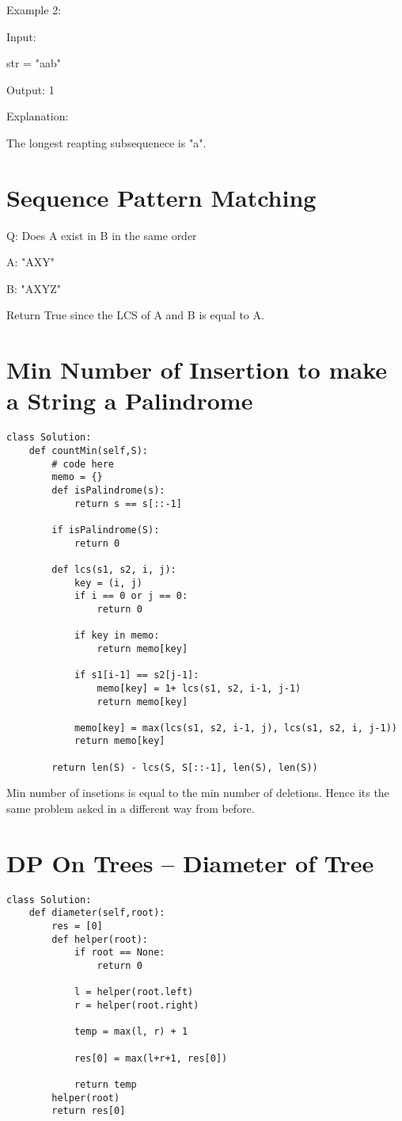 \documentclass[24pt, a4]{article}
\begin{document}
Example 2:

Input:

str = "aab"

Output: 1

Explanation: 

The longest reapting subsequenece is "a".

\newpage
\section{Sequence Pattern Matching}
Q: Does A exist in B in the same order

A: "AXY"

B: "AXYZ"

Return True since the LCS of A and B is equal to A.

\section{Min Number of Insertion to make a String a Palindrome}
\begin{lstlisting}
class Solution:
    def countMin(self,S):
        # code here 
        memo = {}
        def isPalindrome(s):
            return s == s[::-1]
            
        if isPalindrome(S):
            return 0
            
        def lcs(s1, s2, i, j):
            key = (i, j)
            if i == 0 or j == 0:
                return 0
                
            if key in memo:
                return memo[key]
                
            if s1[i-1] == s2[j-1]:
                memo[key] = 1+ lcs(s1, s2, i-1, j-1)
                return memo[key]
                
            memo[key] = max(lcs(s1, s2, i-1, j), lcs(s1, s2, i, j-1))
            return memo[key]
    
        return len(S) - lcs(S, S[::-1], len(S), len(S))
\end{lstlisting}

Min number of insetions is equal to the min number of deletions. Hence its the same problem asked in a different way from before.


\newpage
\section{DP On Trees -- Diameter of Tree}
\begin{lstlisting}
class Solution:    
    def diameter(self,root):
        res = [0]
        def helper(root):
            if root == None:
                return 0
                
            l = helper(root.left)
            r = helper(root.right)
            
            temp = max(l, r) + 1
            
            res[0] = max(l+r+1, res[0])
            
            return temp
        helper(root)
        return res[0]
\end{lstlisting}
\end{document}
